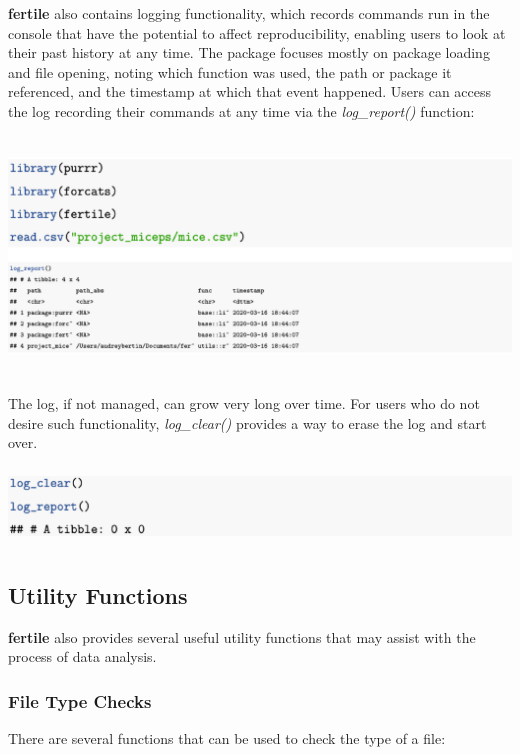 \documentclass[APA,LATO1COL]{WileyNJD-v2}
\begin{document}
\vskip 0.25in

\textbf{fertile} also contains logging functionality, which records commands run in the console that have the potential to affect reproducibility, enabling users to look at their past history at any time. The package focuses mostly on package loading and file opening, noting which function was used, the path or package it referenced, and the timestamp at which that event happened.
Users can access the log recording their commands at any time via the \textit{log\_report()} function:

\vskip 0.25in

\centerline{\includegraphics[height=15pc,width=180mm]{fig-8}}

\vskip 0.25in

The log, if not managed, can grow very long over time. For users who do not desire such functionality, \textit{log\_clear()} provides a way to erase the log and start over.

\vskip 0.25in

\centerline{\includegraphics[height=5pc,width=180mm]{fig-9}}

\vskip 0.25in


\subsection{Utility Functions}

\textbf{fertile} also provides several useful utility functions that may assist with the process of data analysis. 


\subsubsection{File Type Checks}

There are several functions that can be used to check the type of a file: 
\end{document}
